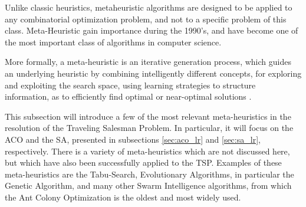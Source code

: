 Unlike classic heuristics, metaheuristic algorithms are designed to be applied to any combinatorial optimization problem, and not to a specific problem of this class. Meta-Heuristic gain importance during the 1990's, and have become one of the most important class of algorithms in computer science.

More formally, a meta-heuristic is an iterative generation process, which guides an underlying heuristic by combining intelligently different concepts, for exploring and exploiting the search space, using learning strategies to structure information, as to efficiently find optimal or near-optimal solutions \cite{metaheuristics_overview}.

This subsection will introduce a few of the most relevant meta-heuristics in the resolution of the Traveling Salesman Problem. In particular, it will focus on the \ac{ACO} and the \ac{SA}, presented in subsections \ref{sec:aco_lr} and \ref{sec:sa_lr}, respectively. There is a variety of meta-heuristics which are not discussed here, but which have also been successfully applied to the TSP. Examples of these meta-heuristics are the Tabu-Search, Evolutionary Algorithms, in particular the Genetic Algorithm, and many other Swarm Intelligence algorithms, from which the Ant Colony Optimization is the oldest and most widely used.
